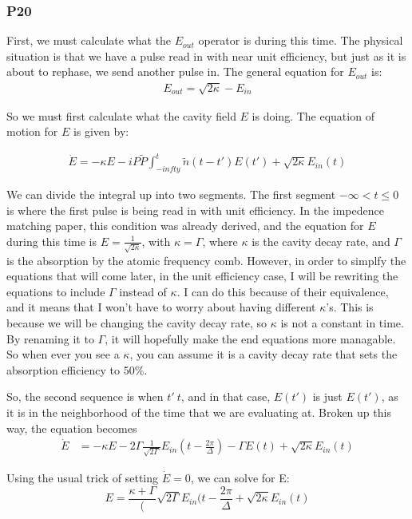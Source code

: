 \documentclass[12pt]{article}
\begin{document}
\begin{enumerate}
\subsubsection{P20}
First, we must calculate what the $E_{out}$ operator is during this time. The physical situation is that we have a
pulse read in with near unit efficiency, but just as it is about to rephase, we send another pulse in. The general equation for $E_{out}$ is:
\begin{align}
E_{out} = \sqrt{2\kappa} - E_{in}
\end{align}

So we must first calculate what the cavity field $E$ is doing. The equation of motion for $E$ is given by:

\begin{align}
\dot{E} = -\kappa E -iP\tilde{P}\int_{-infty}^t\tilde{n}(t-t')E(t')+\sqrt{2\kappa} E_{in}(t)
\end{align}

We can divide the integral up into two segments. The first segment $-\infty<t\le0$ is where the first pulse is being read in with unit efficiency. In the impedence matching paper, this condition was already derived, and the equation for $E$ during this time is $E = \frac{1}{\sqrt{2\kappa}}$, with $\kappa = \Gamma$, where $\kappa$ is the cavity decay rate, and $\Gamma$ is the absorption by the atomic frequency comb. However, in order to simplfy the equations that will come later, in the unit efficiency case, I will be rewriting the equations to include $\Gamma$ instead of $\kappa$. I can do this
because of their equivalence, and it means that I won't have to worry about having different $\kappa$'s. This is because we will be changing the cavity decay rate, so $\kappa$ is not a constant in time. By renaming it to $\Gamma$, it will hopefully make the end equations more managable. So when ever you see a $\kappa$, you can assume it is a cavity decay rate that sets the absorption efficiency to 50\%.

So, the second sequence is when $t'~t$, and in that case, $E(t')$ is just $E(t')$, as it is in the neighborhood of the time
that we are evaluating at. Broken up this way, the equation becomes
\begin{align}
\dot{E} & = -\kappa E -2\Gamma \frac{1}{\sqrt{2\Gamma}}E_{in}(t-\frac{2 \pi}{\Delta}) -\Gamma E(t) +\sqrt{2 \kappa} E_{in}(t)
\end{align}

Using the usual trick of setting $\dot{E}=0$, we can solve for E:
\begin{equation}
E = \frac{\kappa +\Gamma} (\sqrt{2 \Gamma} E_{in}(t-\frac{2 \pi}{\Delta} +\sqrt{2 \kappa}E_{in}(t)
\end{equation}


\end{enumerate}
\end{document}
